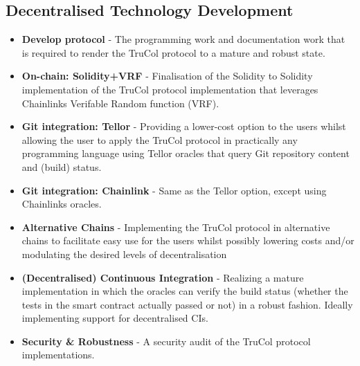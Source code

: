 \subsection{Decentralised Technology Development}
\begin{itemize}
	\item \textbf{Develop protocol} - The programming work and documentation work that is required to render the TruCol protocol to a mature and robust state.
	\item \textbf{On-chain: Solidity+VRF} - Finalisation of the Solidity to Solidity implementation of the TruCol protocol implementation that leverages Chainlinks Verifable Random function (VRF).
	\item \textbf{Git integration: Tellor} - Providing a lower-cost option to the users whilst allowing the user to apply the TruCol protocol in practically any programming language using Tellor oracles that query Git repository content and (build) status.
	\item \textbf{Git integration: Chainlink} - Same as the Tellor option, except using Chainlinks oracles.
	\item \textbf{Alternative Chains} - Implementing the TruCol protocol in alternative chains to facilitate easy use for the users whilst possibly lowering costs and/or modulating the desired levels of decentralisation
	\item \textbf{(Decentralised) Continuous Integration} - Realizing a mature implementation in which the oracles can verify the build status (whether the tests in the smart contract actually passed or not) in a robust fashion. Ideally implementing support for decentralised CIs.
	\item \textbf{Security \& Robustness} - A security audit of the TruCol protocol implementations.
\end{itemize}
